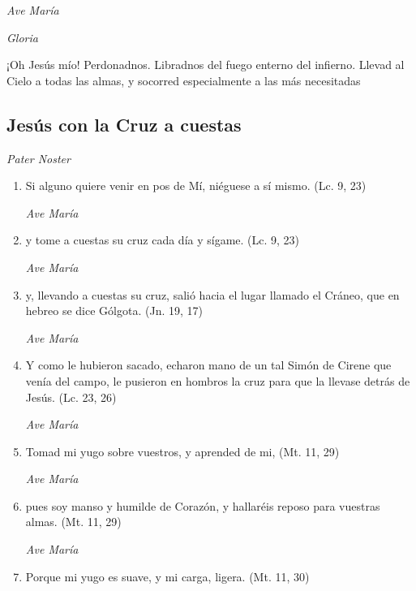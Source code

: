 \documentclass[a4paper,11pt, oneside]{report}
\begin{document}
        \textit{Ave María} \par
        \indent\textit{Gloria} \par
        \indent¡Oh Jesús mío! Perdonadnos. Libradnos del fuego enterno del infierno. Llevad al Cielo a todas las almas, y socorred especialmente a las más 
        necesitadas

      \subsection*{Jesús con la Cruz a cuestas}
      
        \textit{Pater Noster}

        \begin{enumerate}
          
          \item Si alguno quiere venir en pos de Mí, niéguese a sí mismo. (Lc. 9, 23)

          \textit{Ave María}

          \item y tome a cuestas su cruz cada día y sígame. (Lc. 9, 23)

          \textit{Ave María}

          \item y, llevando a cuestas su cruz, salió hacia el lugar llamado el Cráneo, que en hebreo se dice Gólgota. (Jn. 19, 17)

          \textit{Ave María}

          \item Y como le hubieron sacado, echaron mano de un tal Simón de Cirene que venía del campo, le pusieron en hombros la cruz para que la llevase
          detrás de Jesús. (Lc. 23, 26)

          \textit{Ave María}

          \item Tomad mi yugo sobre vuestros, y aprended de mi, (Mt. 11, 29)

          \textit{Ave María}

          \item pues soy manso y humilde de Corazón, y hallaréis reposo para vuestras almas. (Mt. 11, 29)

          \textit{Ave María}

          \item Porque mi yugo es suave, y mi carga, ligera. (Mt. 11, 30)


\end{enumerate}
\end{document}
